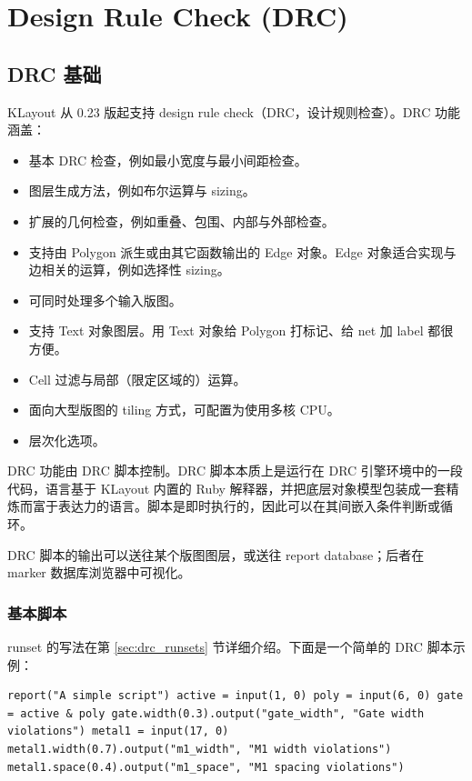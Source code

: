 \chapter{Design Rule Check (DRC)}\label{ch:drc}

\section{DRC 基础}\label{sec:drc_basic}

KLayout 从 0.23 版起支持 design rule check（DRC，设计规则检查）。DRC 功能涵盖：

\begin{itemize}
\item 基本 DRC 检查，例如最小宽度与最小间距检查。
\item 图层生成方法，例如布尔运算与 sizing。
\item 扩展的几何检查，例如重叠、包围、内部与外部检查。
\item 支持由 Polygon 派生或由其它函数输出的 Edge 对象。Edge 对象适合实现与边相关的运算，例如选择性 sizing。
\item 可同时处理多个输入版图。
\item 支持 Text 对象图层。用 Text 对象给 Polygon 打标记、给 net 加 label 都很方便。
\item Cell 过滤与局部（限定区域的）运算。
\item 面向大型版图的 tiling 方式，可配置为使用多核 CPU。
\item 层次化选项。
\end{itemize}

DRC 功能由 DRC 脚本控制。DRC 脚本本质上是运行在 DRC 引擎环境中的一段代码，语言基于 KLayout 内置的 Ruby 解释器，并把底层对象模型包装成一套精炼而富于表达力的语言。脚本是即时执行的，因此可以在其间嵌入条件判断或循环。

DRC 脚本的输出可以送往某个版图图层，或送往 report database；后者在 marker 数据库浏览器中可视化。

\subsection{基本脚本}

runset 的写法在第 \ref{sec:drc_runsets} 节详细介绍。下面是一个简单的 DRC 脚本示例：

\begin{lstlisting}
report("A simple script") active = input(1, 0) poly = input(6, 0) gate = active & poly gate.width(0.3).output("gate_width", "Gate width violations") metal1 = input(17, 0) metal1.width(0.7).output("m1_width", "M1 width violations") metal1.space(0.4).output("m1_space", "M1 spacing violations")
\end{lstlisting}

